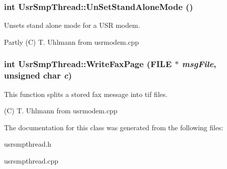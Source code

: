 \subsubsection{\setlength{\rightskip}{0pt plus 5cm}int Usr\-Smp\-Thread::Un\-Set\-Stand\-Alone\-Mode ()}\label{classUsrSmpThread_a14}


Unsets stand alone mode for a USR modem. 

Partly (C) T. Uhlmann from usrmodem.cpp 
\subsubsection{\setlength{\rightskip}{0pt plus 5cm}int Usr\-Smp\-Thread::Write\-Fax\-Page (FILE $\ast$ {\em msg\-File}, unsigned char {\em c})}\label{classUsrSmpThread_a12}


This function splits a stored fax message into tif files. 

(C) T. Uhlmann from usrmodem.cpp 

The documentation for this class was generated from the following files:\begin{CompactItemize}
\item 
usrsmpthread.h\item 
usrsmpthread.cpp\end{CompactItemize}
